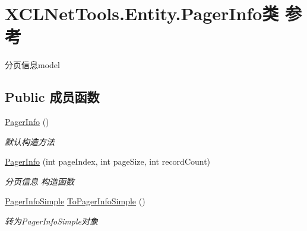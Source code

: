 \hypertarget{class_x_c_l_net_tools_1_1_entity_1_1_pager_info}{}\section{X\+C\+L\+Net\+Tools.\+Entity.\+Pager\+Info类 参考}
\label{class_x_c_l_net_tools_1_1_entity_1_1_pager_info}


分页信息model  


\subsection*{Public 成员函数}
\begin{DoxyCompactItemize}
\item 
\hyperlink{class_x_c_l_net_tools_1_1_entity_1_1_pager_info_a775ef53e33f2270d097eb34e257dc925}{Pager\+Info} ()
\begin{DoxyCompactList}\small\item\em 默认构造方法 \end{DoxyCompactList}\item 
\hyperlink{class_x_c_l_net_tools_1_1_entity_1_1_pager_info_a942f7268d84ce1d1533b678acb7104c6}{Pager\+Info} (int page\+Index, int page\+Size, int record\+Count)
\begin{DoxyCompactList}\small\item\em 分页信息 构造函数 \end{DoxyCompactList}\item 
\hyperlink{class_x_c_l_net_tools_1_1_entity_1_1_pager_info_simple}{Pager\+Info\+Simple} \hyperlink{class_x_c_l_net_tools_1_1_entity_1_1_pager_info_af2b14d5cb33aa660580dc612a0f7b6c8}{To\+Pager\+Info\+Simple} ()
\begin{DoxyCompactList}\small\item\em 转为\+Pager\+Info\+Simple对象 \end{DoxyCompactList}\end{DoxyCompactItemize}
